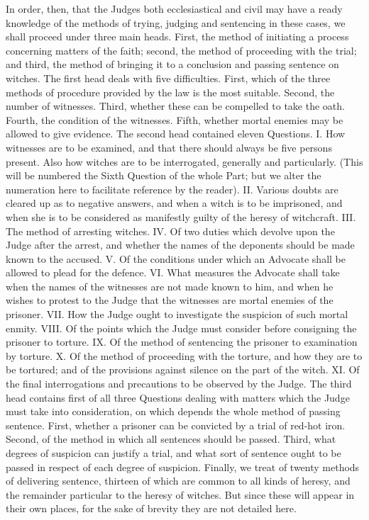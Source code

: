              In order, then, that the Judges both ecclesiastical and civil may have a ready knowledge
       of the methods of trying, judging and sentencing in these cases, we shall proceed under three
       main heads. First, the method of initiating a process concerning matters of the faith; second,
       the method of proceeding with the trial; and third, the method of bringing it to a conclusion
       and passing sentence on witches.
             The first head deals with five difficulties. First, which of the three methods of
       procedure provided by the law is the most suitable. Second, the number of witnesses. Third,
       whether these can be compelled to take the oath. Fourth, the condition of the witnesses.
       Fifth, whether mortal enemies may be allowed to give evidence.
             The second head contained eleven Questions. I. How witnesses are to be examined, and
       that there should always be five persons present. Also how witches are to be interrogated,
       generally and particularly. (This will be numbered the Sixth Question of the whole Part; but
       we alter the numeration here to facilitate reference by the reader). II. Various doubts are
       cleared up as to negative answers, and when a witch is to be imprisoned, and when she is to
       be considered as manifestly guilty of the heresy of witchcraft. III. The method of arresting
       witches. IV. Of two duties which devolve upon the Judge after the arrest, and whether the
       names of the deponents should be made known to the accused. V. Of the conditions under
       which an Advocate shall be allowed to plead for the defence. VI. What measures the
       Advocate shall take when the names of the witnesses are not made known to him, and when
       he wishes to protest to the Judge that the witnesses are mortal enemies of the prisoner. VII.
       How the Judge ought to investigate the suspicion of such mortal enmity. VIII. Of the points
       which the Judge must consider before consigning the prisoner to torture. IX. Of the method
       of sentencing the prisoner to examination by torture. X. Of the method of proceeding with
       the torture, and how they are to be tortured; and of the provisions against silence on the part
       of the witch. XI. Of the final interrogations and precautions to be observed by the Judge.
             The third head contains first of all three Questions dealing with matters which the
       Judge must take into consideration, on which depends the whole method of passing
       sentence. First, whether a prisoner can be convicted by a trial of red-hot iron. Second, of the
       method in which all sentences should be passed. Third, what degrees of suspicion can justify
       a trial, and what sort of sentence ought to be passed in respect of each degree of suspicion.
       Finally, we treat of twenty methods of delivering sentence, thirteen of which are common to
       all kinds of heresy, and the remainder particular to the heresy of witches. But since these
       will appear in their own places, for the sake of brevity they are not detailed here.
